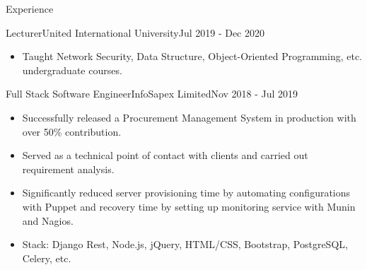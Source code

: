 \documentclass[]{mcdowellcv}
\begin{document}
\begin{cvsection}{Experience}
		\begin{cvsubsection}{Lecturer}{United International University}{Jul 2019 - Dec 2020}
			\begin{itemize}
				\item Taught Network Security, Data Structure, Object-Oriented Programming, etc. undergraduate courses.
			\end{itemize}
		\end{cvsubsection}
		\begin{cvsubsection}{Full Stack Software Engineer}{InfoSapex Limited}{Nov 2018 - Jul 2019}
			\begin{itemize}
				\item Successfully released a Procurement Management System in production with over 50\% contribution.
				\item Served as a technical point of contact with clients and carried out requirement analysis.
				\item Significantly reduced server provisioning time by automating configurations with Puppet and recovery time by setting up monitoring service with Munin and Nagios.
				\item Stack: Django Rest, Node.js, jQuery, HTML/CSS, Bootstrap, PostgreSQL, Celery, etc.
			\end{itemize}
		\end{cvsubsection}

	\end{cvsection}
\end{document}

